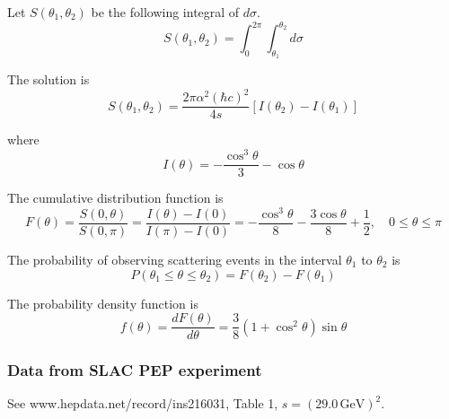 Let $S(\theta_1,\theta_2)$ be the following integral of $d\sigma$.
\begin{equation*}
S(\theta_1,\theta_2)=\int_0^{2\pi}\int_{\theta_1}^{\theta_2}d\sigma
\end{equation*}

The solution is
\begin{equation*}
S(\theta_1,\theta_2)=\frac{2\pi\alpha^2(\hbar c)^2}{4s}[I(\theta_2)-I(\theta_1)]
\end{equation*}

where
\begin{equation*}
I(\theta)=-\frac{\cos^3\theta}{3}-\cos\theta
\end{equation*}

The cumulative distribution function is
\begin{equation*}
F(\theta)
=\frac{S(0,\theta)}{S(0,\pi)}
=\frac{I(\theta)-I(0)}{I(\pi)-I(0)}
=-\frac{\cos^3\theta}{8}-\frac{3\cos\theta}{8}+\frac{1}{2},
\quad
0\le\theta\le\pi
\end{equation*}

The probability of observing scattering events in the interval $\theta_1$ to $\theta_2$ is
\begin{equation*}
P(\theta_1\le\theta\le\theta_2)=F(\theta_2)-F(\theta_1)
\end{equation*}

The probability density function is
\begin{equation*}
f(\theta)=\frac{dF(\theta)}{d\theta}
=\frac{3}{8}
\left(1+\cos^2\theta\right)
\sin\theta
\end{equation*}

\subsubsection*{Data from SLAC PEP experiment}

See www.hepdata.net/record/ins216031, Table 1, $s=(29.0\,\text{GeV})^2$.

